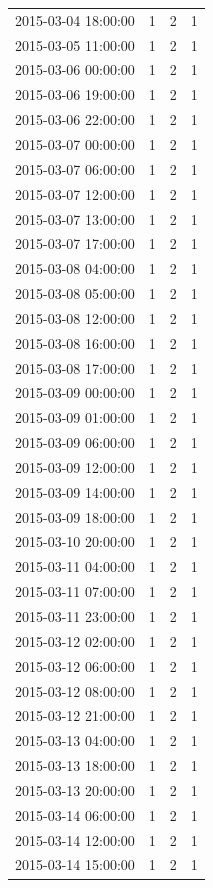 \begin{tabular}{lrrr}
2015-03-04 18:00:00 & 1 & 2 & 1 \\
2015-03-05 11:00:00 & 1 & 2 & 1 \\
2015-03-06 00:00:00 & 1 & 2 & 1 \\
2015-03-06 19:00:00 & 1 & 2 & 1 \\
2015-03-06 22:00:00 & 1 & 2 & 1 \\
2015-03-07 00:00:00 & 1 & 2 & 1 \\
2015-03-07 06:00:00 & 1 & 2 & 1 \\
2015-03-07 12:00:00 & 1 & 2 & 1 \\
2015-03-07 13:00:00 & 1 & 2 & 1 \\
2015-03-07 17:00:00 & 1 & 2 & 1 \\
2015-03-08 04:00:00 & 1 & 2 & 1 \\
2015-03-08 05:00:00 & 1 & 2 & 1 \\
2015-03-08 12:00:00 & 1 & 2 & 1 \\
2015-03-08 16:00:00 & 1 & 2 & 1 \\
2015-03-08 17:00:00 & 1 & 2 & 1 \\
2015-03-09 00:00:00 & 1 & 2 & 1 \\
2015-03-09 01:00:00 & 1 & 2 & 1 \\
2015-03-09 06:00:00 & 1 & 2 & 1 \\
2015-03-09 12:00:00 & 1 & 2 & 1 \\
2015-03-09 14:00:00 & 1 & 2 & 1 \\
2015-03-09 18:00:00 & 1 & 2 & 1 \\
2015-03-10 20:00:00 & 1 & 2 & 1 \\
2015-03-11 04:00:00 & 1 & 2 & 1 \\
2015-03-11 07:00:00 & 1 & 2 & 1 \\
2015-03-11 23:00:00 & 1 & 2 & 1 \\
2015-03-12 02:00:00 & 1 & 2 & 1 \\
2015-03-12 06:00:00 & 1 & 2 & 1 \\
2015-03-12 08:00:00 & 1 & 2 & 1 \\
2015-03-12 21:00:00 & 1 & 2 & 1 \\
2015-03-13 04:00:00 & 1 & 2 & 1 \\
2015-03-13 18:00:00 & 1 & 2 & 1 \\
2015-03-13 20:00:00 & 1 & 2 & 1 \\
2015-03-14 06:00:00 & 1 & 2 & 1 \\
2015-03-14 12:00:00 & 1 & 2 & 1 \\
2015-03-14 15:00:00 & 1 & 2 & 1 \\

\end{tabular}
